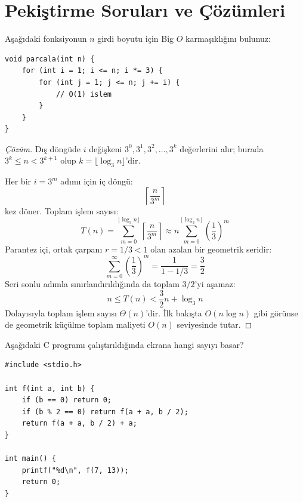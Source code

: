 \section{Pekiştirme Soruları ve Çözümleri}

\begin{example}
Aşağıdaki fonksiyonun $n$ girdi boyutu için Big $O$ karmaşıklığını bulunuz:

\begin{lstlisting}[language=CTemel]
void parcala(int n) {
    for (int i = 1; i <= n; i *= 3) {
        for (int j = 1; j <= n; j += i) {
            // O(1) islem
        }
    }
}
\end{lstlisting}
\end{example}

\begin{proof}[Çözüm]
Dış döngüde $i$ değişkeni $3^0, 3^1, 3^2, \dots, 3^k$ değerlerini alır; burada $3^k \le n < 3^{k+1}$ olup $k = \lfloor \log_3 n \rfloor$'dir. 

Her bir $i = 3^m$ adımı için iç döngü:
\[
\left\lceil \frac{n}{3^m} \right\rceil
\]
kez döner. Toplam işlem sayısı:
\[
T(n) = \sum_{m=0}^{\lfloor \log_3 n \rfloor} \left\lceil \frac{n}{3^m} \right\rceil \approx n \sum_{m=0}^{\lfloor \log_3 n \rfloor} \left(\frac{1}{3}\right)^m
\]
Parantez içi, ortak çarpanı $r = 1/3 < 1$ olan azalan bir geometrik seridir:
\[
\sum_{m=0}^\infty \left(\frac{1}{3}\right)^m = \frac{1}{1 - 1/3} = \frac{3}{2}
\]
Seri sonlu adımla sınırlandırıldığında da toplam $3/2$'yi aşamaz:
\[
n \le T(n) < \frac{3}{2} n + \log_3 n
\]
Dolayısıyla toplam işlem sayısı $\Theta(n)$'dir. İlk bakışta $O(n \log n)$ gibi görünse de geometrik küçülme toplam maliyeti $O(n)$ seviyesinde tutar.
\end{proof}

\begin{example}
Aşağıdaki C programı çalıştırıldığında ekrana hangi sayıyı basar?

\begin{lstlisting}[language=CTemel]
#include <stdio.h>

int f(int a, int b) {
    if (b == 0) return 0;
    if (b % 2 == 0) return f(a + a, b / 2);
    return f(a + a, b / 2) + a;
}

int main() {
    printf("%d\n", f(7, 13));
    return 0;
}
\end{lstlisting}
\end{example}

